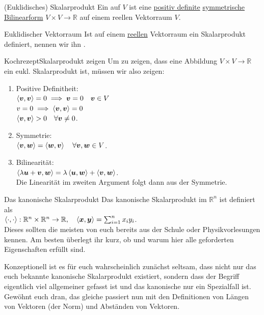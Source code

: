 \begin{Def}
{(Euklidisches) Skalarprodukt}
Ein  auf $V$ ist eine \underline{positiv definite} \underline{symmetrische Bilinearform} $V\times V\to \mathbb{R}$ auf einem reellen Vektorraum $V$.
\end{Def}
\begin{Def}
{Euklidischer Vektorraum}
Ist auf einem \underline{reellen} Vektorraum ein Skalarprodukt definiert, nennen wir ihn .
\end{Def}
\begin{Satz}
{Kochrezept}{Skalarprodukt zeigen}
Um zu zeigen, dass eine Abbildung $V\times V\to\mathbb{R}$ ein eukl. Skalarprodukt ist, müssen wir also zeigen:
\begin{enumerate}
    \item Positive Definitheit:\\
    $\left\langle{{\text{\boldmath${v}$}}},{{\text{\boldmath${v}$}}}\right\rangle=0\implies {{\text{\boldmath${v}$}}}=0\quad {{\text{\boldmath${v}$}}}\in V$\\
    $v=0\implies \left\langle{{\text{\boldmath${v}$}}},{{\text{\boldmath${v}$}}}\right\rangle=0$\\
    $\left\langle{{\text{\boldmath${v}$}}},{{\text{\boldmath${v}$}}}\right\rangle>0\quad \forall {{\text{\boldmath${v}$}}}\neq 0$.
    \item Symmetrie:\\
    $\left\langle{{\text{\boldmath${v}$}}},{{\text{\boldmath${w}$}}}\right\rangle=\left\langle{{\text{\boldmath${w}$}}},{{\text{\boldmath${v}$}}}\right\rangle\quad \forall {{\text{\boldmath${v}$}}},{{\text{\boldmath${w}$}}}\in V$.
    \item Bilinearität:\\
    $\left\langle\lambda {{\text{\boldmath${u}$}}}+{{\text{\boldmath${v}$}}},{{\text{\boldmath${w}$}}}\right\rangle=\lambda\left\langle{{\text{\boldmath${u}$}}},{{\text{\boldmath${w}$}}}\right\rangle+\left\langle{{\text{\boldmath${v}$}}},{{\text{\boldmath${w}$}}}\right\rangle$.\\
    Die Linearität im zweiten Argument folgt dann aus der Symmetrie.
\end{enumerate}
\end{Satz}
\begin{Beispiel}
{Das kanonische Skalarprodukt}
Das kanonische Skalarprodukt im $\mathbb{R}^n$ ist definiert als\\
$\left\langle\cdot,\cdot\right\rangle:\mathbb{R}^n\times\mathbb{R}^n\to\mathbb{R},\quad \left\langle{\text{\boldmath${x}$}},{\text{\boldmath${y}$}}\right\rangle=\sum_{i=1}^nx_iy_i$.\\
Dieses sollten die meisten von euch bereits aus der Schule oder Physikvorlesungen kennen. Am besten überlegt ihr kurz, ob und warum hier alle geforderten Eigenschaften erfüllt sind.
\end{Beispiel}
Konzeptionell ist es für euch wahrscheinlich zunächst seltsam, dass nicht nur das euch bekannte kanonische Skalarprodukt existiert, sondern dass der Begriff eigentlich viel allgemeiner gefasst ist und das kanonische nur ein Spezialfall ist. Gewöhnt euch dran, das gleiche passiert nun mit den Definitionen von Längen von Vektoren (der Norm) und Abständen von Vektoren.

